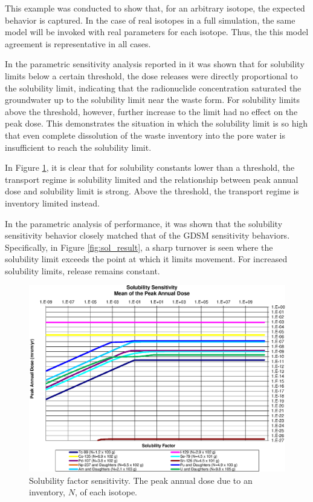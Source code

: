 
This example was conducted to show that, for an arbitrary isotope, the expected 
behavior is captured. In the case of real isotopes in a full simulation, the 
same model will be invoked with real parameters for each isotope. Thus, the 
this model agreement is representative in all cases.

In the parametric sensitivity analysis reported in \cite{huff_key_2012} it was 
shown that for solubility limits below a certain threshold, the dose releases 
were directly proportional to the solubility limit, indicating that the 
radionuclide concentration saturated the groundwater up to the solubility limit 
near the waste form.  For solubility limits above the threshold, however, 
further increase to the limit had no effect on the peak dose. This demonstrates 
the situation in which the solubility limit is so high that even complete 
dissolution of the waste inventory into the pore water is insufficient to reach 
the solubility limit.

In Figure \ref{fig:SolSumFactor}, it is clear that for 
solubility constants lower than a threshold, the transport regime is solubility 
limited and the relationship between peak annual dose and solubility limit is 
strong.  Above the threshold, the transport regime is inventory limited 
instead.

In the parametric analysis of \Cyder performance, it was shown that the 
solubility sensitivity behavior closely matched that of the \gls{GDSM} 
sensitivity behaviors. Specifically, in Figure \ref{fig:sol_result}, a sharp turnover 
is seen where the solubility limit exceeds the point at which it limits 
movement. For increased solubility limits, release remains constant.

\begin{figure}[ht]
\begin{center}
\includegraphics[width=0.7\linewidth]{./Solubility_Summary_SolFactor.eps}
\caption[Solubility factor sensitivity in GDSM Clay model]{Solubility factor sensitivity. The peak annual dose due to an inventory, 
$N$, of each isotope.}
\label{fig:SolSumFactor}
\end{center}
\end{figure}

